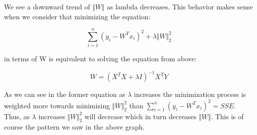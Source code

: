 \documentclass{article}
\begin{document}
We see a downward trend of $\Vert W \Vert$ as lambda decreases. This behavior makes sense when we consider that minimizing the equation: 

$$
\sum_{i = 1}^{n} (y_{i}-W^{T} x_{i})^{2} + \lambda \Vert W \Vert_{2}^{2}
$$

in terms of W is equivalent to solving the equation from above:

$$
W = (X^{T}X + \lambda I)^{-1}X^{T}Y
$$

As we can see in the former equation as $\lambda$ increases the minimization process is weighted more towards minimizing $\Vert W \Vert_{2}^{2}$ than $\sum_{i = 1}^{n} (y_{i}-W^{T} x_{i})^{2} = SSE$. Thus, as $\lambda$ increases $\Vert W \Vert_{2}^{2}$ will decrease which in turn decreases $\Vert W \Vert$. This is of course the pattern we saw in the above graph.
	
	
	 
	
	
\end{document}
